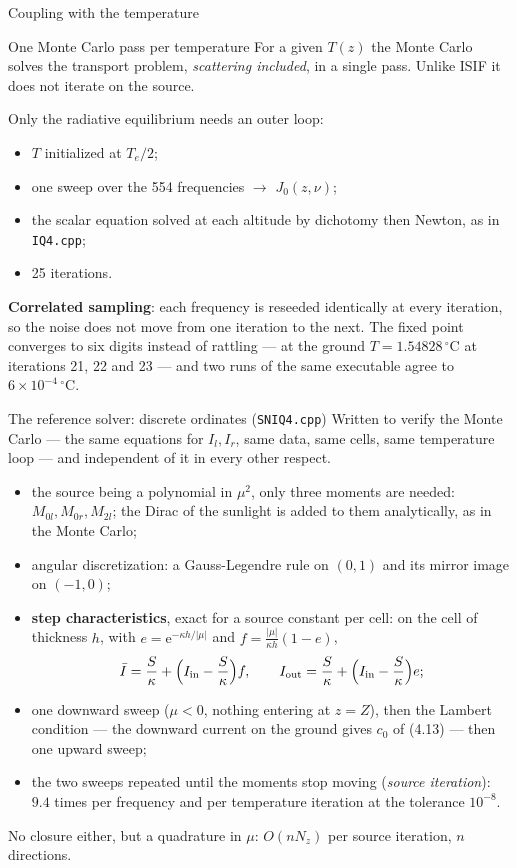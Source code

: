 \documentclass[aspectratio=169,10pt]{beamer}
\newcommand{\e}{\mathrm{e}}
\newcommand{\ISIF}{\texttt{IQ4.cpp}}
\begin{document}
\begin{frame}{Coupling with the temperature}
\begin{block}{One Monte Carlo pass per temperature}
For a given $T(z)$ the Monte Carlo solves the transport problem, \emph{scattering
included}, in a single pass. Unlike ISIF it does not iterate on the source.
\end{block}
Only the radiative equilibrium needs an outer loop:
\begin{itemize}
\item $T$ initialized at $T_e/2$;
\item one sweep over the 554 frequencies $\to$ $J_0(z,\nu)$;
\item the scalar equation solved at each altitude by dichotomy then Newton, as in \ISIF;
\item 25 iterations.
\end{itemize}
\medskip

\textbf{Correlated sampling}: each frequency is reseeded identically at every iteration,
so the noise does not move from one iteration to the next. The fixed point converges to
six digits instead of rattling --- at the ground $T=1.54828\,^\circ$C at iterations
21, 22 and 23 --- and two runs of the same executable agree to $6\times10^{-4}\,^\circ$C.
\end{frame}

\begin{frame}{The reference solver: discrete ordinates (\texttt{SNIQ4.cpp})}
Written to verify the Monte Carlo --- the same equations for $I_l,I_r$, same data, same cells,
same temperature loop --- and independent of it in every other respect.
\begin{itemize}
\item the source being a polynomial in $\mu^2$, only three moments are needed:
$M_{0l},M_{0r},M_{2l}$; the Dirac of the sunlight is added to them analytically, as in the
Monte Carlo;
\item angular discretization: a Gauss-Legendre rule on $(0,1)$ and its mirror image on
$(-1,0)$;
\item \textbf{step characteristics}, exact for a source constant per cell: on the cell of
thickness $h$, with $e=\e^{-\kappa h/|\mu|}$ and $f=\frac{|\mu|}{\kappa h}(1-e)$,
\[
\bar I=\frac S\kappa+\Big(I_{\rm in}-\frac S\kappa\Big)f,
\qquad
I_{\rm out}=\frac S\kappa+\Big(I_{\rm in}-\frac S\kappa\Big)e ;
\]
\item one downward sweep ($\mu<0$, nothing entering at $z=Z$), then the Lambert condition
--- the downward current on the ground gives $c_0$ of (4.13) --- then one upward sweep;
\item the two sweeps repeated until the moments stop moving (\emph{source iteration}):
$9.4$ times per frequency and per temperature iteration at the tolerance $10^{-8}$.
\end{itemize}
\begin{block}{}
\centering
No closure either, but a quadrature in $\mu$: $O(nN_z)$ per source iteration, $n$ directions.
\end{block}
\end{frame}
\end{document}
